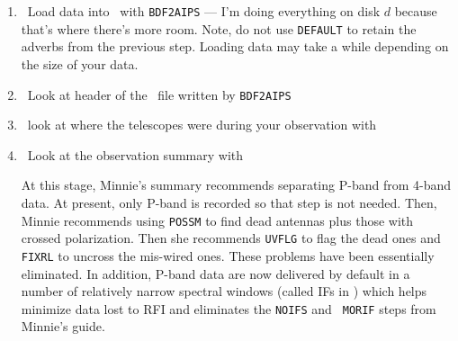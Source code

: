 \begin{enumerate}
\item\ Load data into \AIPS\ with {\tt BDF2AIPS} --- I'm doing
  everything on disk $d$ because that's where there's more room.
  Note, do not use {\tt DEFAULT} to retain the adverbs from the
  previous step.  Loading data may take a while depending on the size
  of your data.

\item\ Look at header of the \AIPS\ file written by {\tt BDF2AIPS}

\item\ look at where the telescopes were during your observation with
     {\tt {}}

\item\ Look at the observation summary with {\tt {}}

At this stage, Minnie's summary recommends separating P-band from
4-band data.  At present, only P-band is recorded so that step is not
needed.  Then, Minnie recommends using {\tt POSSM} to find dead
antennas plus those with crossed polarization.  Then she recommends
{\tt UVFLG} to flag the dead ones and {\tt FIXRL} to uncross the
mis-wired ones.  These problems have been essentially eliminated.
In addition, P-band data are now delivered by default in a number of
relatively narrow spectral windows (called IFs in \AIPS) which helps
minimize data lost to RFI and eliminates the {\tt NOIFS} and {\tt
  MORIF} steps from Minnie's guide.


\end{enumerate}
